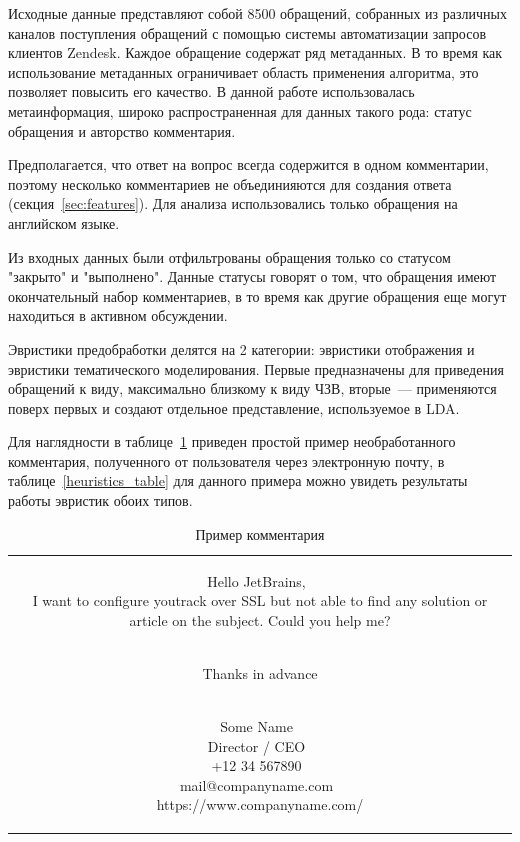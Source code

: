 Исходные данные представляют собой 8500 обращений, собранных из различных каналов поступления обращений с помощью системы автоматизации запросов клиентов Zendesk. Каждое обращение содержат ряд метаданных. В то время как использование метаданных ограничивает область применения алгоритма, это позволяет повысить его качество. В данной работе использовалась метаинформация, широко распространенная для данных такого рода: статус обращения и авторство комментария.

Предполагается, что ответ на вопрос всегда содержится в одном комментарии, поэтому несколько комментариев не объединияются для создания ответа (секция~\ref{sec:features}). Для анализа использовались только обращения на английском языке.

Из входных данных были отфильтрованы обращения только со статусом "закрыто" и "выполнено". Данные статусы говорят о том, что обращения  имеют окончательный набор комментариев, в то время как другие обращения еще могут находиться в активном обсуждении.

Эвристики предобработки делятся на 2 категории: эвристики отображения и эвристики тематического моделирования. Первые предназначены для приведения обращений к виду, максимально близкому к виду ЧЗВ, вторые~--- применяются поверх первых и создают отдельное представление, используемое в LDA.

Для наглядности в таблице~\ref{comment_example} приведен простой пример необработанного комментария, полученного от пользователя через электронную почту, в таблице~\ref{heuristics_table} для данного примера можно увидеть результаты работы эвристик обоих типов.

\begin{table}[!ht]
\caption{Пример комментария}
\label{comment_example}
\centering
\begin{tabular}{|c}
\parbox[t]{8cm}{Hello JetBrains,~\\ 
I want to configure youtrack over SSL but
not able to find any solution or article on the subject. Could you help me?

~\\
Thanks in advance

~\\
Some Name~\\
Director / CEO~\\
+12 34 567890~\\
mail@companyname.com~\\
https://www.companyname.com/} \\
\end{tabular}
\end{table}


